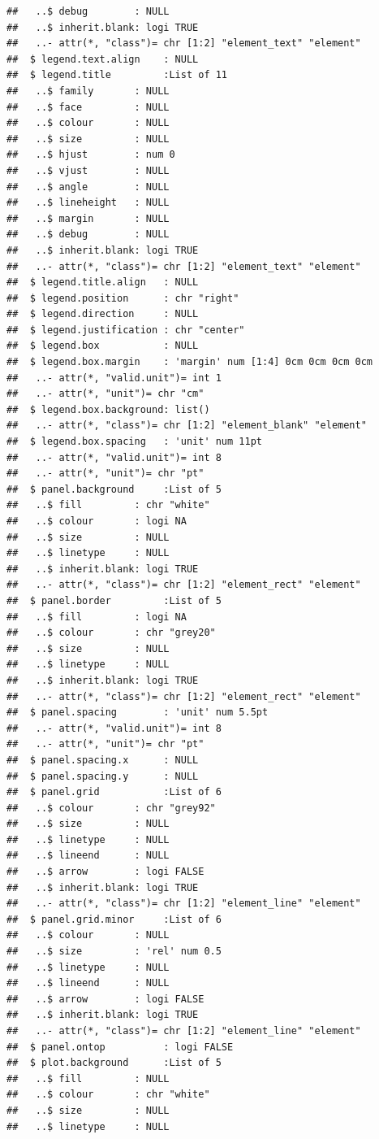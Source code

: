 \documentclass[]{article}
\begin{document}
\begin{verbatim}
##   ..$ debug        : NULL
##   ..$ inherit.blank: logi TRUE
##   ..- attr(*, "class")= chr [1:2] "element_text" "element"
##  $ legend.text.align    : NULL
##  $ legend.title         :List of 11
##   ..$ family       : NULL
##   ..$ face         : NULL
##   ..$ colour       : NULL
##   ..$ size         : NULL
##   ..$ hjust        : num 0
##   ..$ vjust        : NULL
##   ..$ angle        : NULL
##   ..$ lineheight   : NULL
##   ..$ margin       : NULL
##   ..$ debug        : NULL
##   ..$ inherit.blank: logi TRUE
##   ..- attr(*, "class")= chr [1:2] "element_text" "element"
##  $ legend.title.align   : NULL
##  $ legend.position      : chr "right"
##  $ legend.direction     : NULL
##  $ legend.justification : chr "center"
##  $ legend.box           : NULL
##  $ legend.box.margin    : 'margin' num [1:4] 0cm 0cm 0cm 0cm
##   ..- attr(*, "valid.unit")= int 1
##   ..- attr(*, "unit")= chr "cm"
##  $ legend.box.background: list()
##   ..- attr(*, "class")= chr [1:2] "element_blank" "element"
##  $ legend.box.spacing   : 'unit' num 11pt
##   ..- attr(*, "valid.unit")= int 8
##   ..- attr(*, "unit")= chr "pt"
##  $ panel.background     :List of 5
##   ..$ fill         : chr "white"
##   ..$ colour       : logi NA
##   ..$ size         : NULL
##   ..$ linetype     : NULL
##   ..$ inherit.blank: logi TRUE
##   ..- attr(*, "class")= chr [1:2] "element_rect" "element"
##  $ panel.border         :List of 5
##   ..$ fill         : logi NA
##   ..$ colour       : chr "grey20"
##   ..$ size         : NULL
##   ..$ linetype     : NULL
##   ..$ inherit.blank: logi TRUE
##   ..- attr(*, "class")= chr [1:2] "element_rect" "element"
##  $ panel.spacing        : 'unit' num 5.5pt
##   ..- attr(*, "valid.unit")= int 8
##   ..- attr(*, "unit")= chr "pt"
##  $ panel.spacing.x      : NULL
##  $ panel.spacing.y      : NULL
##  $ panel.grid           :List of 6
##   ..$ colour       : chr "grey92"
##   ..$ size         : NULL
##   ..$ linetype     : NULL
##   ..$ lineend      : NULL
##   ..$ arrow        : logi FALSE
##   ..$ inherit.blank: logi TRUE
##   ..- attr(*, "class")= chr [1:2] "element_line" "element"
##  $ panel.grid.minor     :List of 6
##   ..$ colour       : NULL
##   ..$ size         : 'rel' num 0.5
##   ..$ linetype     : NULL
##   ..$ lineend      : NULL
##   ..$ arrow        : logi FALSE
##   ..$ inherit.blank: logi TRUE
##   ..- attr(*, "class")= chr [1:2] "element_line" "element"
##  $ panel.ontop          : logi FALSE
##  $ plot.background      :List of 5
##   ..$ fill         : NULL
##   ..$ colour       : chr "white"
##   ..$ size         : NULL
##   ..$ linetype     : NULL

\end{verbatim}
\end{document}
